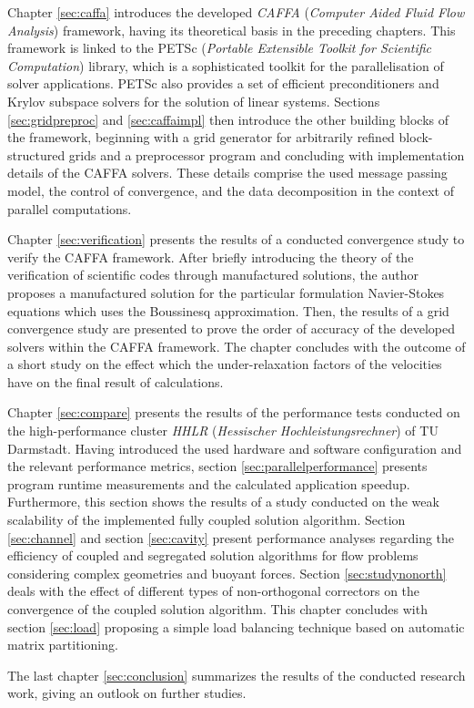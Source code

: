 Chapter \ref{sec:caffa} introduces the developed \emph{CAFFA} (\emph{Computer Aided Fluid Flow Analysis}) framework, having its theoretical basis in the preceding chapters. This framework is linked to the PETSc (\emph{Portable Extensible Toolkit for Scientific Computation}) library, which is a sophisticated toolkit for the parallelisation of solver applications. PETSc also provides a set of efficient preconditioners and Krylov subspace solvers for the solution of linear systems. Sections \ref{sec:gridpreproc} and \ref{sec:caffaimpl} then introduce the other building blocks of the framework, beginning with a grid generator for arbitrarily refined block-structured grids and a preprocessor program and concluding with implementation details of the CAFFA solvers. These details comprise the used message passing model, the control of convergence, and the data decomposition in the context of parallel computations.

Chapter \ref{sec:verification} presents the results of a conducted convergence study to verify the CAFFA framework. After briefly introducing the theory of the verification of scientific codes through manufactured solutions, the author proposes a manufactured solution for the particular formulation Navier-Stokes equations which uses the Boussinesq approximation. Then, the results of a grid convergence study are presented to prove the order of accuracy of the developed solvers within the CAFFA framework. The chapter concludes with the outcome of a short study on the effect which the under-relaxation factors of the velocities have on the final result of calculations.

Chapter \ref{sec:compare} presents the results of the performance tests conducted on the high-performance cluster \emph{HHLR} (\emph{Hessischer Hochleistungsrechner}) of TU Darmstadt. Having introduced the used hardware and software configuration and the relevant performance metrics, section \ref{sec:parallelperformance} presents program runtime measurements and the calculated application speedup. Furthermore, this section shows the results of a study conducted on the weak scalability of the implemented fully coupled solution algorithm. Section \ref{sec:channel} and section \ref{sec:cavity} present performance analyses regarding the efficiency of coupled and segregated solution algorithms for flow problems considering complex geometries and buoyant forces. Section \ref{sec:studynonorth} deals with the effect of different types of non-orthogonal correctors on the convergence of the coupled solution algorithm. This chapter concludes with section \ref{sec:load} proposing a simple load balancing technique based on automatic matrix partitioning.

The last chapter \ref{sec:conclusion} summarizes the results of the conducted research work, giving an outlook on further studies.

